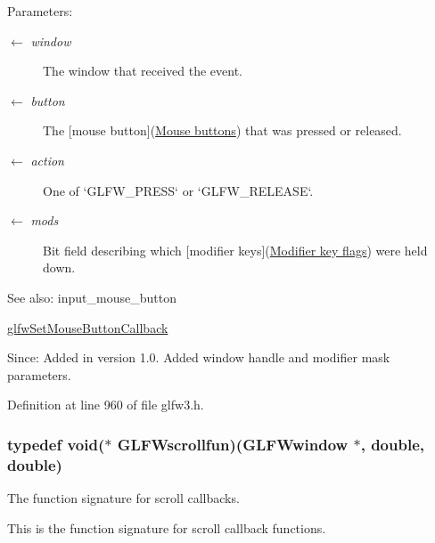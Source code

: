 \begin{Desc}
\item[Parameters:]
\begin{description}
\item[\mbox{$\leftarrow$} {\em window}]The window that received the event. \item[\mbox{$\leftarrow$} {\em button}]The \mbox{[}mouse button\mbox{]}(\hyperlink{group__buttons}{Mouse buttons}) that was pressed or released. \item[\mbox{$\leftarrow$} {\em action}]One of `GLFW\_\-PRESS` or `GLFW\_\-RELEASE`. \item[\mbox{$\leftarrow$} {\em mods}]Bit field describing which \mbox{[}modifier keys\mbox{]}(\hyperlink{group__mods}{Modifier key flags}) were held down.\end{description}
\end{Desc}
\begin{Desc}
\item[See also:]input\_\-mouse\_\-button 

\hyperlink{group__input_g20e5ba1ce4e086aedd48a06dc311c95f}{glfwSetMouseButtonCallback}\end{Desc}
\begin{Desc}
\item[Since:]Added in version 1.0.  Added window handle and modifier mask parameters. \end{Desc}


Definition at line 960 of file glfw3.h.\hypertarget{group__input_g6228cdf94d28fbd3a9a1fbb0e5922a8a}{
\subsubsection[GLFWscrollfun]{\setlength{\rightskip}{0pt plus 5cm}typedef void($\ast$  {\bf GLFWscrollfun})({\bf GLFWwindow} $\ast$, double, double)}}
\label{group__input_g6228cdf94d28fbd3a9a1fbb0e5922a8a}


The function signature for scroll callbacks. 

This is the function signature for scroll callback functions.

